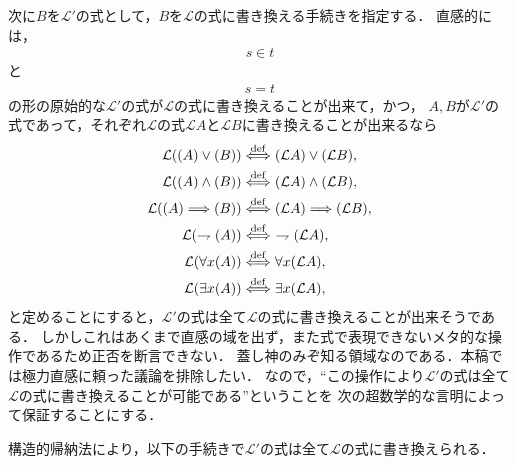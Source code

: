 	次に$B$を$\mathcal{L}'$の式として，$B$を$\mathcal{L}$の式に書き換える手続きを指定する．
	直感的には，
	\begin{align}
		s \in t
	\end{align}
	と
	\begin{align}
		s = t
	\end{align}
	の形の原始的な$\mathcal{L}'$の式が$\mathcal{L}$の式に書き換えることが出来て，かつ，
	$A,B$が$\mathcal{L}'$の式であって，それぞれ$\mathcal{L}$の式$\mathcal{L}A$と$\mathcal{L}B$に書き換えることが出来るなら
	\begin{align}
		\mathcal{L}((A) \vee (B)) &\defarrow (\mathcal{L}A) \vee (\mathcal{L}B), \\
		\mathcal{L}((A) \wedge (B)) &\defarrow (\mathcal{L}A) \wedge (\mathcal{L}B), \\
		\mathcal{L}((A) \Longrightarrow (B)) &\defarrow (\mathcal{L}A) \Longrightarrow (\mathcal{L}B), \\
		\mathcal{L}(\rightharpoondown (A)) &\defarrow\ \rightharpoondown (\mathcal{L}A), \\
		\mathcal{L}(\forall x (A)) &\defarrow \forall x (\mathcal{L}A), \\
		\mathcal{L}(\exists x (A)) &\defarrow \exists x (\mathcal{L}A), \\
	\end{align}
	と定めることにすると，$\mathcal{L}'$の式は全て$\mathcal{L}$の式に書き換えることが出来そうである．
	しかしこれはあくまで直感の域を出ず，また式で表現できないメタ的な操作であるため正否を断言できない．
	蓋し神のみぞ知る領域なのである．本稿では極力直感に頼った議論を排除したい．
	なので，``この操作により$\mathcal{L}'$の式は全て$\mathcal{L}$の式に書き換えることが可能である''ということを
	次の超数学的な言明によって保証することにする．
	
	\begin{screen}
		\begin{metaaxm}[構造的帰納法]
			
		\end{metaaxm}
	\end{screen}
	
	構造的帰納法により，以下の手続きで$\mathcal{L}'$の式は全て$\mathcal{L}$の式に書き換えられる．
	
